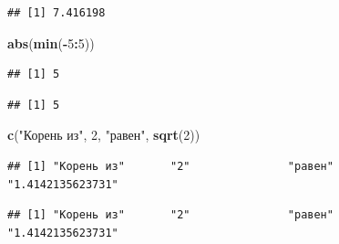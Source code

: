 \documentclass[]{book}
\newenvironment{Shaded}{\begin{snugshade}}{\end{snugshade}}
\newcommand{\KeywordTok}[1]{\textcolor[rgb]{0.13,0.29,0.53}{\textbf{#1}}}
\newcommand{\DecValTok}[1]{\textcolor[rgb]{0.00,0.00,0.81}{#1}}
\newcommand{\StringTok}[1]{\textcolor[rgb]{0.31,0.60,0.02}{#1}}
\newcommand{\OperatorTok}[1]{\textcolor[rgb]{0.81,0.36,0.00}{\textbf{#1}}}
\newcommand{\NormalTok}[1]{#1}
\begin{document}
\begin{verbatim}
## [1] 7.416198
\end{verbatim}

\begin{Shaded}
\begin{Highlighting}[]
\KeywordTok{abs}\NormalTok{(}\KeywordTok{min}\NormalTok{(}\OperatorTok{-}\DecValTok{5}\OperatorTok{:}\DecValTok{5}\NormalTok{))}
\end{Highlighting}
\end{Shaded}

\begin{verbatim}
## [1] 5
\end{verbatim}

\begin{Shaded}
\end{Shaded}

\begin{verbatim}
## [1] 5
\end{verbatim}

\begin{Shaded}
\begin{Highlighting}[]
\KeywordTok{c}\NormalTok{(}\StringTok{"Корень из"}\NormalTok{, }\DecValTok{2}\NormalTok{, }\StringTok{"равен"}\NormalTok{, }\KeywordTok{sqrt}\NormalTok{(}\DecValTok{2}\NormalTok{))}
\end{Highlighting}
\end{Shaded}

\begin{verbatim}
## [1] "Корень из"       "2"               "равен"           "1.4142135623731"
\end{verbatim}

\begin{Shaded}
\end{Shaded}

\begin{verbatim}
## [1] "Корень из"       "2"               "равен"           "1.4142135623731"
\end{verbatim}
\end{document}

